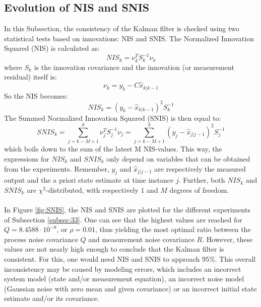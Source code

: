 \documentclass[a4paper,kul]{kulakarticle} %
\begin{document}
\subsection{Evolution of NIS and SNIS}
In this Subsection, the consistency of the Kalman filter is checked using two statistical tests based on innovations: NIS and SNIS. The Normalized Innovation Squared (NIS) is calculated as:
\begin{equation}
	NIS_k = \nu_k^T S_k^{-1}\nu_k
\end{equation}
where $S_k$ is the innovation covariance and the innovation (or measurement residual) itself is:
\begin{equation}
	\nu_k = y_k - C \hat{x}_{k|k-1}
\end{equation}
So the NIS becomes:
\begin{equation}
	NIS_k = (y_k - \hat{x}_{k|k-1})^2 S_k^{-1}
\end{equation}
The Summed Normalized Innovation Squared (SNIS) is then equal to:
\begin{equation}
	SNIS_k = \sum_{j = k-M+1}^{k} \nu_j^T S_j^{-1}\nu_j = \sum_{j = k-M+1}^{k} (y_j - \hat{x}_{j|j-1})^2 S_j^{-1}
\end{equation}
which boils down to the sum of the latest M NIS-values. This way, the expressions for $NIS_k$ and $SNIS_k$ only depend on variables that can be obtained from the experiments. Remember, $y_j$ and $\hat{x}_{j|j-1}$ are respectively the measured output and the a priori state estimate at time instance $j$. Further, both $NIS_k$ and $SNIS_k$ are $\chi^2$-distributed, with respectively $1$ and $M$ degrees of freedom.
\\\\
In Figure \ref{fig:SNIS}, the NIS and SNIS are plotted for the different experiments of Subsection \ref{subsec:33}. One can see that the highest values are reached for $Q = 8.4588\cdot10^{-8}$, or $\rho = 0.01$, thus yielding the most optimal ratio between the process noise covariance $Q$ and measurement noise covariance $R$. However, these values are not nearly high enough to conclude that the Kalman filter is consistent. For this, one would need NIS and SNIS to approach $95\%$. This overall inconsistency may be caused by modeling errors, which includes an incorrect system model (state and/or measurement equation), an incorrect noise model (Gaussian noise with zero mean and given covariance) or an incorrect initial state estimate and/or its covariance. 
\end{document}

